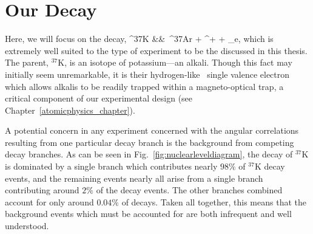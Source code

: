 

















\section{Our Decay}
Here, we will focus on the decay,
\bea
^{37}\textrm{K} &\rightarrow& \,^{37}\textrm{\!Ar} + \beta^{+} + \nu_e, 
\label{eq:ourdecay}
\eea
which is extremely well suited to the type of experiment to be the discussed in this thesis.  
The parent, $^{37}\textrm{K}$, is an isotope of potassium---an alkali.  Though this fact may initially seem unremarkable, it is their hydrogen-like~ single valence electron which allows alkalis to be readily trapped within a magneto-optical trap, a critical component of our experimental design (see Chapter~\ref{atomicphysics_chapter}).

A potential concern in any experiment concerned with the angular correlations resulting from one particular decay branch is the background from competing decay branches.  As can be seen in Fig.~\ref{fig:nuclearleveldiagram}, the decay of $^{37}\textrm{K}$ is dominated by a single branch which contributes nearly $98\%$ of $^{37}\textrm{K}$ decay events, and the remaining events nearly all arise from a single branch contributing around $2\%$ of the decay events.  The other branches combined account for only around $0.04\%$ of decays.  Taken all together, this means that the background events which must be accounted for are both infrequent and well understood.

